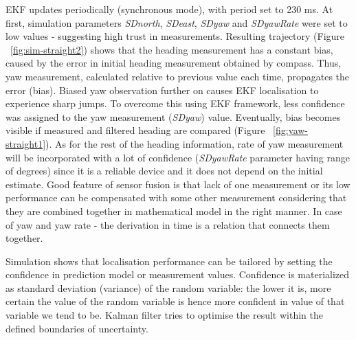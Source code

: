 EKF updates periodically (synchronous mode), with period set to 230 ms. At first, simulation parameters \textit{SDnorth}, \textit{SDeast}, \textit{SDyaw} and \textit{SDyawRate} were set to low values - suggesting high trust in measurements. Resulting trajectory (Figure ~\ref{fig:sim-straight2}) shows that the heading measurement has a constant bias, caused by the error in initial heading measurement obtained by compass. Thus, yaw measurement, calculated relative to previous value each time, propagates the error (bias). Biased yaw observation further on causes EKF localisation to experience sharp jumps. To overcome this using EKF framework, less confidence was assigned to the yaw measurement (\textit{SDyaw}) value. Eventually, bias becomes visible if measured and filtered heading are compared (Figure ~\ref{fig:yaw-straight1}). As for the rest of the heading information, rate of yaw measurement will be incorporated with a lot of confidence (\textit{SDyawRate} parameter having range of degrees) since it is a reliable device and it does not depend on the initial estimate. Good feature of sensor fusion is that lack of one measurement or its low performance can be compensated with some other measurement considering that they are combined together in mathematical model in the right manner. In case of yaw and yaw rate - the derivation in time is a relation that connects them together. 

Simulation shows that localisation performance can be tailored by setting the confidence in prediction model or measurement values. Confidence is materialized as standard deviation (variance) of the random variable: the lower it is, more certain the value of the random variable is hence more confident in value of that variable we tend to be. Kalman filter tries to optimise the result within the defined boundaries of uncertainty. 

